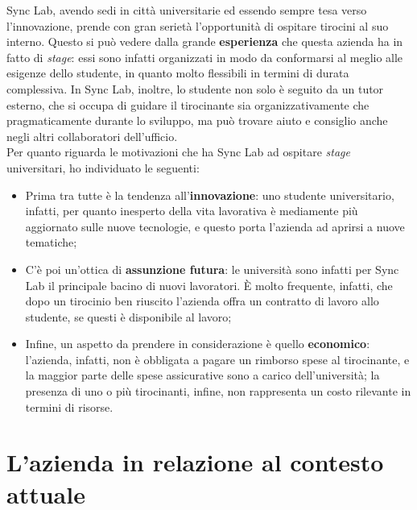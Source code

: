 Sync Lab, avendo sedi in città universitarie ed essendo sempre tesa verso l'innovazione, prende con gran serietà l'opportunità di ospitare tirocini al suo interno. Questo si può vedere dalla grande \textbf{esperienza} che questa azienda ha in fatto di \textit{stage}: essi sono infatti organizzati in modo da conformarsi al meglio alle esigenze dello studente, in quanto molto flessibili in termini di durata complessiva. In Sync Lab, inoltre, lo studente non solo è seguito da un tutor esterno, che si occupa di guidare il tirocinante sia organizzativamente che pragmaticamente durante lo sviluppo, ma può trovare aiuto e consiglio anche negli altri collaboratori dell'ufficio. \\
Per quanto riguarda le motivazioni che ha Sync Lab ad ospitare \textit{stage} universitari, ho individuato le seguenti:
\begin{itemize}
  \item Prima tra tutte è la tendenza all'\textbf{innovazione}: uno studente universitario, infatti, per quanto inesperto della vita lavorativa è mediamente più aggiornato sulle nuove tecnologie, e questo porta l'azienda ad aprirsi a nuove tematiche;
  \item C'è poi un'ottica di \textbf{assunzione futura}: le università sono infatti per Sync Lab il principale bacino di nuovi lavoratori. È molto frequente, infatti, che dopo un tirocinio ben riuscito l'azienda offra un contratto di lavoro allo studente, se questi è disponibile al lavoro;
  \item Infine, un aspetto da prendere in considerazione è quello \textbf{economico}: l'azienda, infatti, non è obbligata a pagare un rimborso spese al tirocinante, e la maggior parte delle spese assicurative sono a carico dell'università; la presenza di uno o più tirocinanti, infine, non rappresenta un costo rilevante in termini di risorse.
\end{itemize}


\section{L'azienda in relazione al contesto attuale}

